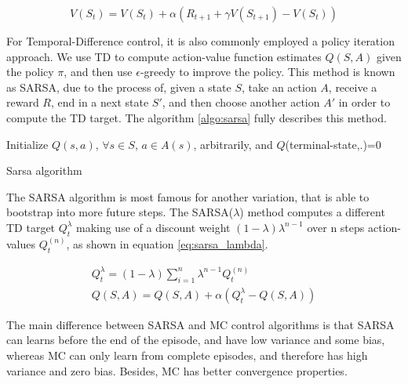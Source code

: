 \begin{equation}
V(S_t) = V(S_t) + \alpha(R_{t+1} + \gamma V(S_{t+1}) - V(S_t))
\label{eq:TD0_update}
\end{equation}

For Temporal-Difference control, it is also commonly employed a policy iteration approach. We use TD to compute action-value function estimates $Q(S,A)$ given the policy $\pi$, and then use $\epsilon$-greedy to improve the policy. This method is known as SARSA, due to the process of, given a state $S$, take an action $A$, receive a reward $R$, end in a next state $S'$, and then choose another action $A'$ in order to compute the TD target. The algorithm \ref{algo:sarsa} fully describes this method.

\begin{algorithm}[H]
    \DontPrintSemicolon
    \SetAlgoLined
    Initialize $Q(s,a)$, $\forall s \in S$, $a \in A(s)$, arbitrarily, and $Q$(terminal-state,.)=0\;
    \caption{Sarsa algorithm}
    \label{algo:sarsa}
\end{algorithm}

The SARSA algorithm is most famous for another variation, that is able to bootstrap into more future steps. The SARSA($\lambda$) method computes a different TD target $Q_t^{\lambda}$ making use of a discount weight $(1-\lambda) \lambda^{n-1}$ over n steps action-values $Q_t^{(n)}$, as shown in equation \ref{eq:sarsa_lambda}.

\begin{align}
Q_t^{\lambda} = (1 - \lambda) \sum_{i=1}^{n}{\lambda^{n-1}Q_t^{(n)}} \\
Q(S,A) = Q(S,A) + \alpha( Q_t^{\lambda} - Q(S,A))
\label{eq:sarsa_lambda}
\end{align}

The main difference between SARSA and MC control algorithms is that SARSA can learns before the end of the episode, and have low variance and some bias, whereas MC can only learn from complete episodes, and therefore has high variance and zero bias. Besides, MC has better convergence properties.


